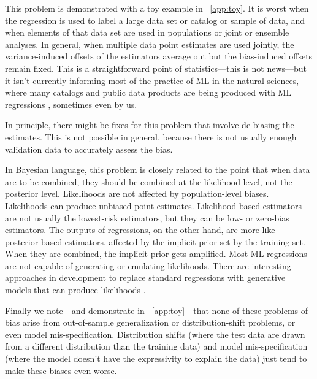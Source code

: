 \documentclass{article}
\begin{document}
This problem is demonstrated with a toy example in \appendixname~\ref{app:toy}.
It is worst when the regression is used to label a large data set or catalog or sample of data,
and when elements of that data set are used in populations or joint or ensemble analyses.
In general, when multiple data point estimates are used jointly, the variance-induced offsets of the estimators average out but the bias-induced offsets remain fixed.
This is a straightforward point of statistics---this is not news---but it isn't currently informing most of the practice of ML in the natural sciences, where many catalogs and public data products are being produced with ML regressions \cite{spectrophotometric, leung, aspgap}, sometimes even by us.

In principle, there might be fixes for this problem that involve de-biasing the estimates.
This is not possible in general, because there is not usually enough validation data to accurately assess the bias.

In Bayesian language, this problem is closely related to the point that when data are to be combined, they should be combined at the likelihood level, not the posterior level.
Likelihoods are not affected by population-level biases.
Likelihoods can produce unbiased point estimates.
Likelihood-based estimators are not usually the lowest-risk estimators, but they can be low- or zero-bias estimators.
The outputs of regressions, on the other hand, are more like posterior-based estimators, affected by the implicit prior set by the training set.
When they are combined, the implicit prior gets amplified.
Most ML regressions are not capable of generating or emulating likelihoods.
There are interesting approaches in development to replace standard regressions with generative models that can produce likelihoods \cite{cannon, likelihood_ratio, sequential, biwei}.

Finally we note---and demonstrate in \appendixname~\ref{app:toy}---that none of these problems of bias arise from out-of-sample generalization or distribution-shift problems, or even model mis-specification.
Distribution shifts (where the test data are drawn from a different distribution than the training data) and model mis-specification (where the model doesn't have the expressivity to explain the data) just tend to make these biases even worse.
\end{document}
